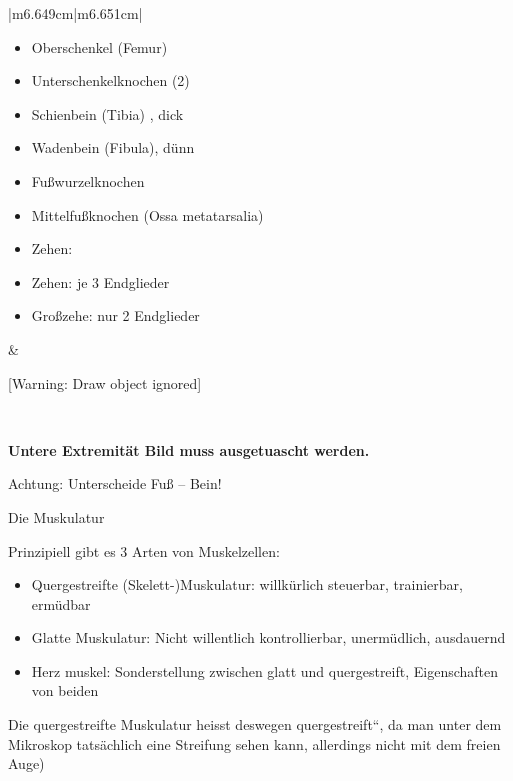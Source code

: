 \documentclass{article}
\begin{document}
\begin{center}
\tablehead{}\begin{supertabular}{|m{6.649cm}|m{6.651cm}|}
\hline
\begin{itemize}
\item {\mdseries Oberschenkel  (Femur)}

\item {\mdseries Unterschenkelknochen (2)}

\end{itemize}
\begin{itemize}
\item {\mdseries Schienbein  (Tibia) , dick}

\item {\mdseries Wadenbein  (Fibula), d\"unn}

\end{itemize}
\begin{itemize}
\item { Fu{\ss}wurzelknochen}

\item { Mittelfu{\ss}knochen  (Ossa metatarsalia)}

\item { Zehen:}

\end{itemize}
\begin{itemize}
\item { Zehen: je 3  Endglieder}

\item { Gro{\ss}zehe: nur 2 Endglieder}

\end{itemize}
 &
{\centering %
%
[Warning: Draw object ignored]\par}

\\\hline
\end{supertabular}
\end{center}
{\bfseries\color[rgb]{0.5019608,0.0,0.0}
Untere Extremit\"at Bild muss ausgetuascht werden.}

{\mdseries
Achtung: Unterscheide Fu{\ss} -- Bein!}

{\mdseries\color[rgb]{0.0,0.0,0.5019608}
Die Muskulatur}

{\mdseries
Prinzipiell gibt es 3  Arten von Muskelzellen:}

\begin{itemize}
\item Quergestreifte (Skelett-)Muskulatur: willk\"urlich steuerbar,
trainierbar, er\-m\"ud\-bar

\item Glatte  Muskulatur: Nicht willentlich kontrollierbar,
unerm\"udlich, ausdauernd 

\item Herz muskel: Sonderstellung zwischen glatt und quergestreift,
Eigenschaften von beiden

\end{itemize}
{\mdseries
Die quergestreifte Muskulatur heisst deswegen
{\quotedblbase}quergestreift{\textquotedblleft}, da man unter dem
Mikroskop tats\"achlich eine Streifung sehen kann, allerdings nicht mit
dem freien Auge) }
\end{document}
